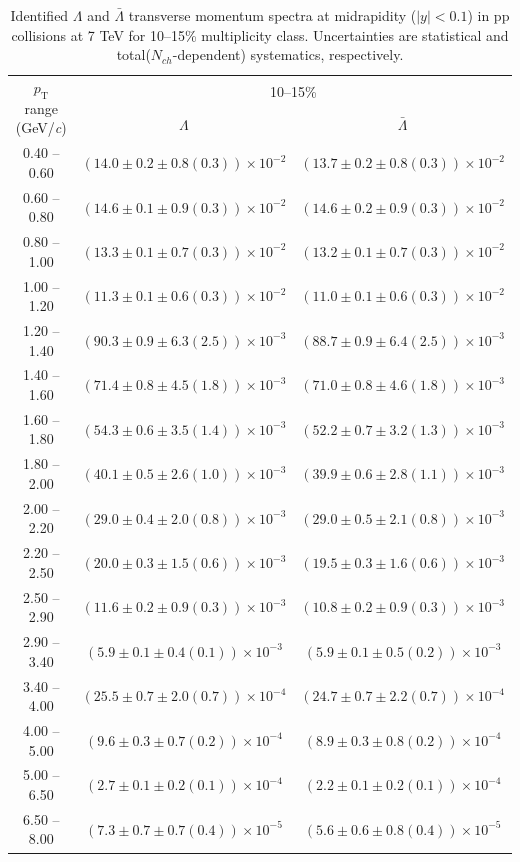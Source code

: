 \begin{table}
\caption{Identified $\Lambda$ and $\bar{\Lambda}$  transverse momentum spectra at midrapidity ($|y|<0.1$) in pp collisions at 7 TeV for 10--15\% multiplicity class. Uncertainties are statistical and total($N_{ch}$-dependent) systematics, respectively.}
\label{tab:Lambda_AntiLambda_10to15}
\begin{center}
\begin{tabular}{ c | c c }
\hline
\multirow{2}{*}{$p_{\mathrm{T}}$ range (GeV/\textit{c})} & \multicolumn{2}{c}{10--15\%} \\ & $\Lambda$& $\bar{\Lambda}$\\ 
\hline
0.40 -- 0.60 & $(14.0\pm0.2\pm0.8(0.3))\times10^{-2}$ & $(13.7\pm0.2\pm0.8(0.3))\times10^{-2}$ \\ 
0.60 -- 0.80 & $(14.6\pm0.1\pm0.9(0.3))\times10^{-2}$ & $(14.6\pm0.2\pm0.9(0.3))\times10^{-2}$ \\ 
0.80 -- 1.00 & $(13.3\pm0.1\pm0.7(0.3))\times10^{-2}$ & $(13.2\pm0.1\pm0.7(0.3))\times10^{-2}$ \\ 
1.00 -- 1.20 & $(11.3\pm0.1\pm0.6(0.3))\times10^{-2}$ & $(11.0\pm0.1\pm0.6(0.3))\times10^{-2}$ \\ 
1.20 -- 1.40 & $(90.3\pm0.9\pm6.3(2.5))\times10^{-3}$ & $(88.7\pm0.9\pm6.4(2.5))\times10^{-3}$ \\ 
1.40 -- 1.60 & $(71.4\pm0.8\pm4.5(1.8))\times10^{-3}$ & $(71.0\pm0.8\pm4.6(1.8))\times10^{-3}$ \\ 
1.60 -- 1.80 & $(54.3\pm0.6\pm3.5(1.4))\times10^{-3}$ & $(52.2\pm0.7\pm3.2(1.3))\times10^{-3}$ \\ 
1.80 -- 2.00 & $(40.1\pm0.5\pm2.6(1.0))\times10^{-3}$ & $(39.9\pm0.6\pm2.8(1.1))\times10^{-3}$ \\ 
2.00 -- 2.20 & $(29.0\pm0.4\pm2.0(0.8))\times10^{-3}$ & $(29.0\pm0.5\pm2.1(0.8))\times10^{-3}$ \\ 
2.20 -- 2.50 & $(20.0\pm0.3\pm1.5(0.6))\times10^{-3}$ & $(19.5\pm0.3\pm1.6(0.6))\times10^{-3}$ \\ 
2.50 -- 2.90 & $(11.6\pm0.2\pm0.9(0.3))\times10^{-3}$ & $(10.8\pm0.2\pm0.9(0.3))\times10^{-3}$ \\ 
2.90 -- 3.40 & $(5.9\pm0.1\pm0.4(0.1))\times10^{-3}$ & $(5.9\pm0.1\pm0.5(0.2))\times10^{-3}$ \\ 
3.40 -- 4.00 & $(25.5\pm0.7\pm2.0(0.7))\times10^{-4}$ & $(24.7\pm0.7\pm2.2(0.7))\times10^{-4}$ \\ 
4.00 -- 5.00 & $(9.6\pm0.3\pm0.7(0.2))\times10^{-4}$ & $(8.9\pm0.3\pm0.8(0.2))\times10^{-4}$ \\ 
5.00 -- 6.50 & $(2.7\pm0.1\pm0.2(0.1))\times10^{-4}$ & $(2.2\pm0.1\pm0.2(0.1))\times10^{-4}$ \\ 
6.50 -- 8.00 & $(7.3\pm0.7\pm0.7(0.4))\times10^{-5}$ & $(5.6\pm0.6\pm0.8(0.4))\times10^{-5}$ \\ 
\hline
\end{tabular}
\end{center}
\end{table}
 
